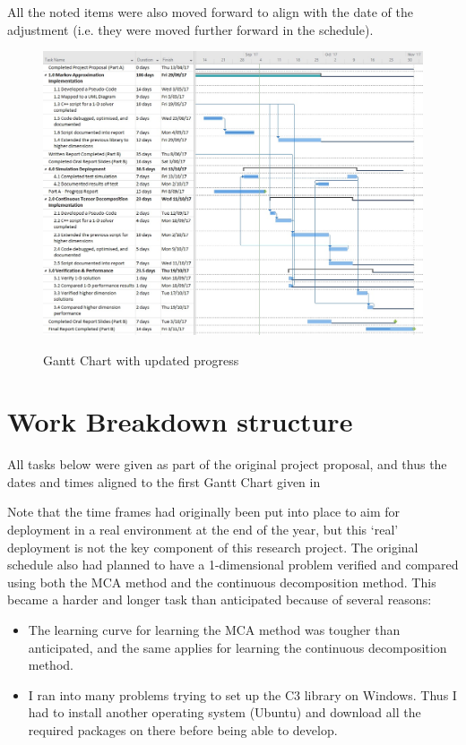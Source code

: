 \documentclass[11pt,draftd]{article}
\begin{document}
\begin{appendices}
	All the noted items were also moved forward to align with the date of the adjustment (i.e. they were moved further forward in the schedule).
	\[\]
	\begin{figure}[h!]
		\centering
		\includegraphics[scale=0.54]{images/UpdatedGanttProgressSem2}
		\label{UpdatedGanttProgress}
		\caption{Gantt Chart with updated progress}
	\end{figure}

\newpage

	\section{Work Breakdown structure}\label{app_itemB}
	All tasks below were given as part of the original project proposal, and thus the dates and times aligned to the first Gantt Chart given in 
	
	Note that the time frames had originally been put into place to aim for deployment in a real environment at the end of the year, but this ‘real’ deployment is not the key component of this research project. The original schedule also had planned to have a 1-dimensional problem verified and compared using both the MCA method and the continuous decomposition method. This became a harder and longer task than anticipated because of several reasons: \\
	\begin{itemize}
		\item The learning curve for learning the MCA method was tougher than anticipated, and the same applies for learning the continuous decomposition method.
		\item I ran into many problems trying to set up the C3 library on Windows. Thus I had to install another operating system (Ubuntu) and download all the required packages on there before being able to develop. \\
	\end{itemize}
	

\end{appendices}
\end{document}
